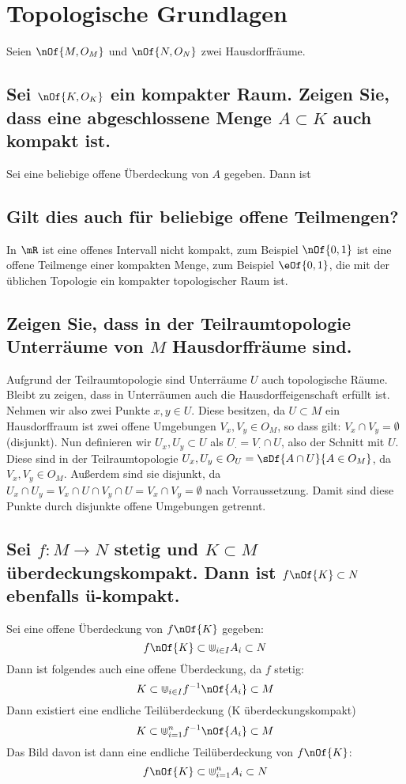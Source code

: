 \documentclass[11pt,a4paper]{scrartcl}
\begin{document}
	\section{Topologische Grundlagen}
	Seien $\nOf{M,O_M}$ und $\nOf{N,O_N}$ zwei Hausdorffräume.

	\subsection{Sei $\nOf{K,O_K}$ ein kompakter Raum. Zeigen Sie, dass eine abgeschlossene Menge $A\subset K$ auch kompakt ist.}
	Sei eine beliebige offene Überdeckung von $A$ gegeben. Dann ist 
 
	\subsection{Gilt dies auch für beliebige offene Teilmengen?}
	In $\mR$ ist eine offenes Intervall nicht kompakt, zum Beispiel $\nOf{0,1}$ ist eine offene Teilmenge einer kompakten Menge, zum Beispiel $\eOf{0,1}$, die mit der üblichen Topologie ein kompakter topologischer Raum ist.

	\subsection{Zeigen Sie, dass in der Teilraumtopologie Unterräume von $M$ Hausdorffräume sind.}
	Aufgrund der Teilraumtopologie sind Unterräume $U$ auch topologische Räume. Bleibt zu zeigen, dass in Unterräumen auch die Hausdorffeigenschaft erfüllt ist. Nehmen wir also zwei Punkte $x,y \in U$. Diese besitzen, da $U\subset M$ ein Hausdorffraum ist zwei offene Umgebungen $V_x, V_y \in O_M$, so dass gilt: $V_x \cap V_y = \emptyset$ (disjunkt). Nun definieren wir $U_x, U_y \subset U$ als $U_{\cdot} = V_{\cdot} \cap U$, also der Schnitt mit $U$. Diese sind in der Teilraumtopologie $U_x,U_y \in O_U = \sDf{A \cap U}{A \in O_M}$, da $V_x, V_y \in O_M$. Außerdem sind sie disjunkt, da $U_x \cap U_y = V_x \cap U \cap V_y \cap U = V_x \cap V_y = \emptyset$ nach Vorraussetzung. Damit sind diese Punkte durch disjunkte offene Umgebungen getrennt. 
	\subsection{Sei $f: M \to N$ stetig und $K \subset M$ überdeckungskompakt. Dann ist $f\nOf{K} \subset N$ ebenfalls ü-kompakt.}
	Sei eine offene Überdeckung von $f\nOf{K}$ gegeben:
	\begin{equation}
		f\nOf{K} \subset \Cup_{i\in I} A_i \subset N
	\end{equation}
	Dann ist folgendes auch eine offene Überdeckung, da $f$ stetig:
	\begin{equation}
		K \subset \Cup_{i\in I} f^{-1}\nOf{A_i} \subset M
	\end{equation}
	Dann existiert eine endliche Teilüberdeckung (K überdeckungskompakt)
	\begin{equation}
		K \subset \Cup_{i = 1}^n f^{-1}\nOf{A_i} \subset M
	\end{equation}
	Das Bild davon ist dann eine endliche Teilüberdeckung von $f\nOf{K}$:
	\begin{equation}
		f\nOf{K} \subset \Cup_{i = 1}^n A_i \subset N
	\end{equation}
\end{document}
